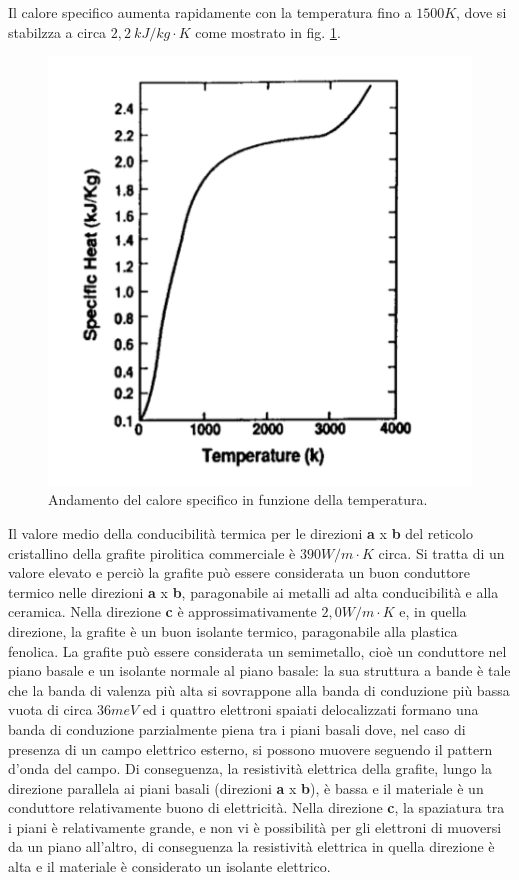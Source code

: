 \documentclass[a4paper,titlepage]{book}
\begin{document}
Il calore specifico aumenta rapidamente con la temperatura fino a $1500 K$, dove si stabilzza a circa $2,2 \: kJ / kg \cdot K$ come mostrato in fig. \ref{cal}. \\
\begin{figure}[h!] 
	\centering
	\includegraphics[width=0.6\columnwidth]{calspecgraf.png}
	\caption{ 	\label{cal}
		Andamento del calore specifico in funzione della temperatura.
	}
\end{figure}

Il valore medio della conducibilità termica per le direzioni \textbf{a} x \textbf{b} del reticolo cristallino della grafite pirolitica commerciale è $390 W/m \cdot K$ circa. Si tratta di un valore elevato e perciò la grafite può essere considerata un buon conduttore termico nelle direzioni \textbf{a} x \textbf{b}, paragonabile ai metalli ad alta conducibilità e alla ceramica. Nella direzione \textbf{c} è approssimativamente $2,0 W/m \cdot K$ e, in quella direzione, la grafite è un buon isolante termico, paragonabile alla plastica fenolica.
La grafite può essere considerata un semimetallo, cioè un conduttore nel piano basale e un isolante normale al piano basale: la sua struttura a bande è tale che la banda di valenza più alta si sovrappone alla banda di conduzione più bassa vuota di circa $36 meV$ ed i quattro elettroni spaiati delocalizzati formano una banda di conduzione parzialmente piena tra i piani basali dove, nel caso di presenza di un campo elettrico esterno, si possono muovere seguendo il pattern d'onda del campo. Di conseguenza, la resistività elettrica della grafite, lungo la direzione parallela ai piani basali (direzioni \textbf{a} x \textbf{b}), è bassa e il materiale è un conduttore relativamente buono di elettricità. 
Nella direzione \textbf{c}, la spaziatura tra i piani è relativamente grande, e non vi è possibilità per gli elettroni di muoversi da un piano all'altro, di conseguenza la resistività elettrica in quella direzione è alta e il materiale è considerato un isolante elettrico. 
\end{document}
